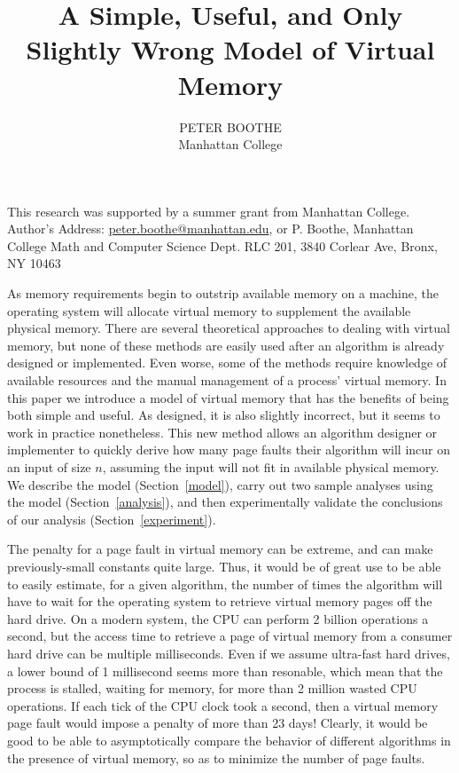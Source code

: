 \documentclass{acmtrans2m}
\title{A Simple, Useful, and Only Slightly Wrong Model of Virtual Memory}
\author{PETER BOOTHE\\
Manhattan College
}
\begin{document}
 
\begin{bottomstuff} 
This research was supported by a summer grant from Manhattan College.\\
Author's Address: \url{peter.boothe@manhattan.edu}, or P. Boothe, Manhattan College Math and Computer Science Dept. RLC 201, 3840 Corlear Ave, Bronx, NY 10463
\end{bottomstuff} 
\maketitle 


As memory requirements begin to outstrip available memory on a machine, the
operating system will allocate virtual memory to supplement the available
physical memory.  There are several theoretical approaches to dealing with
virtual memory, but none of these methods are easily used after an algorithm is
already designed or implemented.  Even worse, some of the methods require
knowledge of available resources and the manual management of a process'
virtual memory.  In this paper we introduce a model of virtual memory that has
the benefits of being both simple and useful.  As designed, it is also slightly
incorrect, but it seems to work in practice nonetheless.  This new method
allows an algorithm designer or implementer to quickly derive how many page
faults their algorithm will incur on an input of size $n$, assuming the input
will not fit in available physical memory.  We describe the model
(Section~\ref{model}), carry out two sample analyses using the model
(Section~\ref{analysis}), and then experimentally validate the conclusions of
our analysis (Section~\ref{experiment}). 

The penalty for a page fault in virtual memory can be extreme, and can make
previously-small constants quite large. Thus, it would be of great use to be
able to easily estimate, for a given algorithm, the number of times the
algorithm will have to wait for the operating system to retrieve virtual memory
pages off the hard drive.  On a modern system, the CPU can perform 2 billion
operations a second, but the access time to retrieve a page of virtual memory
from a consumer hard drive can be multiple milliseconds.  Even if we assume
ultra-fast hard drives, a lower bound of 1 millisecond seems more than
resonable, which mean that the process is stalled, waiting for memory, for more
than 2 million wasted CPU operations.  If each tick of the CPU clock took a
second, then a virtual memory page fault would impose a penalty of more than 23
days!  Clearly, it would be good to be able to asymptotically compare the
behavior of different algorithms in the presence of virtual memory, so as to
minimize the number of page faults.
\end{document}
